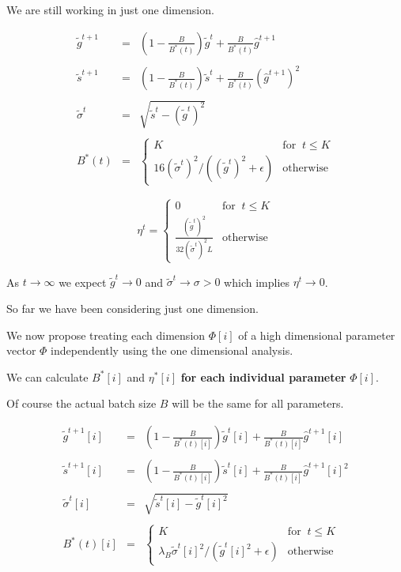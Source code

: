 {\vfill
We are still working in just one dimension.

\begin{eqnarray*}
  \tilde{g}^{t+1} & = & \left(1-\frac{B}{B^*(t)}\right)\tilde{g}^t + \frac{B}{B^*(t)} \hat{g}^{t+1} \\
  \\
  \tilde{s}^{t+1} & = & \left(1-\frac{B}{B^*(t)}\right)\tilde{s}^t + \frac{B}{B^*(t)} (\hat{g}^{t+1})^2 \\
  \\
  \tilde{\sigma}^t & = & \sqrt{\tilde{s}^t - (\tilde{g}^t)^2} \\
  \\
  B^*(t) &= & \left\{\begin{array}{ll} K & \mbox{for}\;\; t \leq K \\
  16(\tilde{\sigma}^t)^2/((\tilde{g}^t)^2 + \epsilon) & \mbox{otherwise} \end{array}\right.
\end{eqnarray*}


$$\eta^t = \left\{\begin{array}{ll} 0 & \mbox{for}\;\;t \leq K \\ \frac{(\tilde{g}^t)^2}{32(\tilde{\sigma}^t)^2L} & \mbox{otherwise}
\end{array}\right.$$

\vfill
As $t \rightarrow \infty$ we expect $\tilde{g}^t \rightarrow 0$ and $\tilde{\sigma}^t \rightarrow \sigma > 0$ which implies
$\eta^t \rightarrow 0$.


So far we have been considering just one dimension.

\vfill
We now propose treating each dimension $\Phi[i]$ of a high dimensional parameter vector $\Phi$ independently using the one dimensional analysis.

\vfill
We can calculate $B^*[i]$ and $\eta^*[i]$ {\bf for each individual parameter} $\Phi[i]$.

\vfill
Of course the actual batch size $B$ will be the same for all parameters.

\begin{eqnarray*}
  \tilde{g}^{t+1}[i] & = & \left(1-\frac{B}{B^*(t)[i]}\right)\tilde{g}^t[i] + \frac{B}{B^*(t)[i]} \hat{g}^{t+1}[i] \\
  \\
  \tilde{s}^{t+1}[i] & = & \left(1-\frac{B}{B^*(t)[i]}\right)\tilde{s}^t[i] + \frac{B}{B^*(t)[i]} \hat{g}^{t+1}[i]^2 \\
  \\
  \tilde{\sigma}^t[i] & = & \sqrt{\tilde{s}^t[i] - \tilde{g}^t[i]^2} \\
  \\
  B^*(t)[i] &= & \left\{\begin{array}{ll} K & \mbox{for}\;\; t \leq K \\
  \lambda_B\tilde{\sigma}^t[i]^2/(\tilde{g}^t[i]^2 + \epsilon) & \mbox{otherwise} \end{array}\right.
\end{eqnarray*}

}
